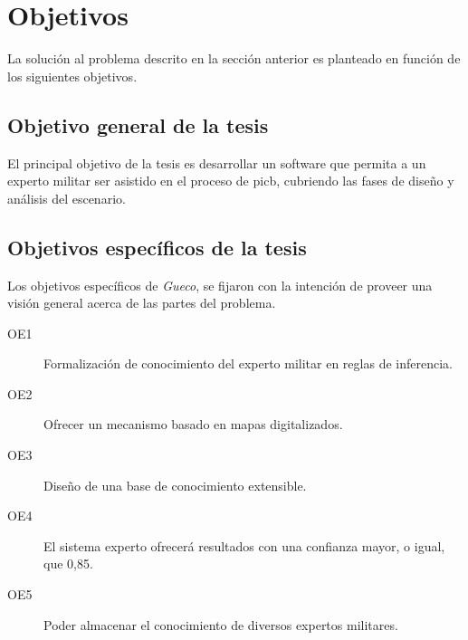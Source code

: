 \section{Objetivos}
La solución al problema descrito en la sección anterior es planteado en función de los siguientes objetivos. 




\subsection{Objetivo general de la tesis}
El principal objetivo de la tesis es desarrollar un software que permita a un experto militar ser asistido en el proceso de \gls{picb}, cubriendo las fases de diseño y análisis del escenario.




\subsection{Objetivos específicos de la tesis}

Los objetivos específicos de \emph{\gls{Gueco}}, se fijaron con la intención de proveer una visión general acerca de las partes del problema.

\begin{description}
  \item[OE1] Formalización de conocimiento del experto militar en reglas de inferencia.
  \item[OE2] Ofrecer un mecanismo basado en mapas digitalizados.
  \item[OE3] Diseño de una base de conocimiento extensible.
  \item[OE4] El sistema experto ofrecerá resultados con una confianza mayor, o igual, que 0,85.
  \item[OE5] Poder almacenar el conocimiento de diversos expertos militares.
\end{description}


